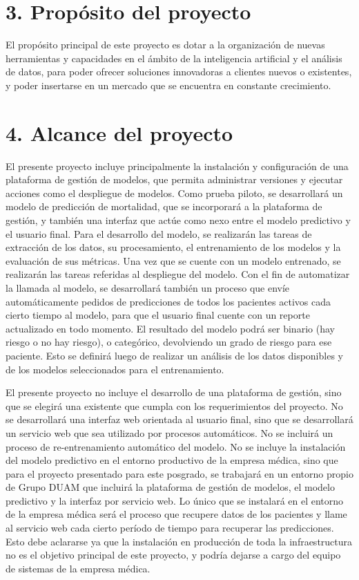 \documentclass[
11pt, %
]{charter}
\begin{document}
\section{3. Propósito del proyecto}
\label{sec:proposito}

El propósito principal de este proyecto es dotar a la organización de nuevas herramientas y capacidades en el ámbito de la inteligencia artificial y el análisis de datos, para poder ofrecer soluciones innovadoras a clientes nuevos o existentes, y poder insertarse en un mercado que se encuentra en constante crecimiento. 

\section{4. Alcance del proyecto}
\label{sec:alcance}

El presente proyecto incluye principalmente la instalación y configuración de una plataforma de gestión de modelos, que permita administrar versiones y ejecutar acciones como el despliegue de modelos.
Como prueba piloto, se desarrollará un modelo de predicción de mortalidad, que se incorporará a la plataforma de gestión, y también una interfaz que actúe como nexo entre el modelo predictivo y el usuario final.
Para el desarrollo del modelo, se realizarán las tareas de extracción de los datos, su procesamiento, el entrenamiento de los modelos y la evaluación de sus métricas. 
Una vez que se cuente con un modelo entrenado, se realizarán las tareas referidas al despliegue del modelo. 
Con el fin de automatizar la llamada al modelo, se desarrollará también un proceso que envíe automáticamente pedidos de predicciones de todos los pacientes activos cada cierto tiempo al modelo, para que el usuario final cuente con un reporte actualizado en todo momento.
El resultado del modelo podrá ser binario (hay riesgo o no hay riesgo), o categórico, devolviendo un grado de riesgo para ese paciente. Esto se definirá luego de realizar un análisis de los datos disponibles y de los modelos seleccionados para el entrenamiento.

El presente proyecto no incluye el desarrollo de una plataforma de gestión, sino que se elegirá una existente que cumpla con los requerimientos del proyecto. No se desarrollará una interfaz web orientada al usuario final, sino que se desarrollará un servicio web que sea utilizado por procesos automáticos. No se incluirá un proceso de re-entrenamiento automático del modelo.
No se incluye la instalación del modelo predictivo en el entorno productivo de la empresa médica, sino que para el proyecto presentado para este posgrado, se trabajará en un entorno propio de Grupo DUAM que incluirá la plataforma de gestión de modelos, el modelo predictivo y la interfaz por servicio web. Lo único que se instalará en el entorno de la empresa médica será el proceso que recupere datos de los pacientes y llame al servicio web cada cierto período de tiempo para recuperar las predicciones. Esto debe aclararse ya que la instalación en producción de toda la infraestructura no es el objetivo principal de este proyecto, y podría dejarse a cargo del equipo de sistemas de la empresa médica.
\end{document}
